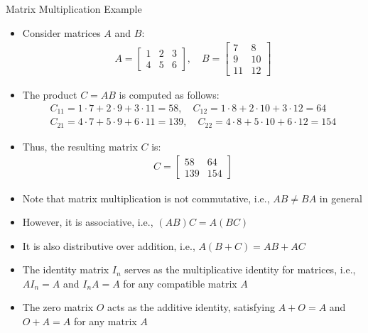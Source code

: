 \begin{frame}{Matrix Multiplication Example}
\begin{itemize}
    \item Consider matrices $A$ and $B$:
    \begin{align*}
        A = \begin{bmatrix}
            1 & 2 & 3\\
            4 & 5 & 6
        \end{bmatrix}, \quad B = \begin{bmatrix}    
            7 & 8\\
            9 & 10\\
            11 & 12
        \end{bmatrix}
    \end{align*}
    \item The product $C = AB$ is computed as follows:
    \begin{align*}
        C_{11} = 1 \cdot 7 + 2 \cdot    9 + 3 \cdot 11 = 58, \quad
        C_{12} = 1 \cdot 8 + 2 \cdot 10 + 3 \cdot 12 = 64\\
        C_{21} = 4 \cdot 7 + 5 \cdot 9 + 6 \cdot 11 = 139, \quad
        C_{22} = 4 \cdot 8 + 5 \cdot 10 + 6 \cdot 12 = 154
    \end{align*}
\end{itemize}
\end{frame}

\begin{frame}
    \begin{itemize}
        \item Thus, the resulting matrix $C$ is:
    \begin{align*}  
        C = \begin{bmatrix}
            58 & 64\\
            139 & 154
        \end{bmatrix}
    \end{align*}
        \item Note that matrix multiplication is not commutative, i.e., $AB \neq BA$ in general
        \item However, it is associative, i.e., $(AB)C = A(BC)$
        \item It is also distributive over addition, i.e., $A(B + C) = AB + AC$
        \item The identity matrix $I_n$ serves as the multiplicative identity for matrices, i.e., $AI_n = A$ and $I_nA = A$ for any compatible matrix $A$
        \item The zero matrix $O$ acts as the additive identity, satisfying $A + O = A$ and $O + A = A$ for any matrix $A$
    \end{itemize}
\end{frame}